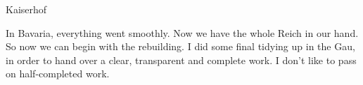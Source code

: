 Kaiserhof

In Bavaria, everything went smoothly. Now we have the whole Reich in our hand. So now we can begin with the rebuilding. I did some final tidying up in the Gau, in order to hand over a clear, transparent and complete work. I don't like to pass on half-completed work.

